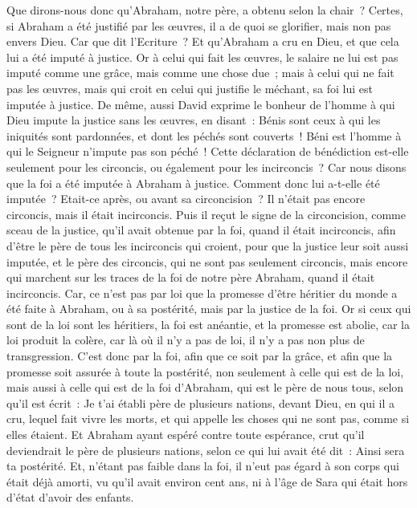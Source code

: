 \begin{multicols}{2}
\VerseOne{}Que dirons-nous donc qu'Abraham, notre père, a obtenu selon la chair~?
Certes, si Abraham a été justifié par les œuvres, il a de quoi se glorifier, mais non pas envers Dieu.
Car que dit l'Ecriture~? Et qu'Abraham a cru en Dieu, et que cela lui a été imputé à justice.
Or à celui qui fait les œuvres, le salaire ne lui est pas imputé comme une grâce, mais comme une chose due~;
mais à celui qui ne fait pas les œuvres, mais qui croit en celui qui justifie le méchant, sa foi lui est imputée à justice.
De même, aussi David exprime le bonheur de l'homme à qui Dieu impute la justice sans les œuvres, en disant~:
Bénis sont ceux à qui les iniquités sont pardonnées, et dont les péchés sont couverts~!
Béni est l'homme à qui le Seigneur n'impute pas son péché~!
Cette déclaration de bénédiction est-elle seulement pour les circoncis, ou également pour les incirconcis~? Car nous disons que la foi a été imputée à Abraham à justice.
Comment donc lui a-t-elle été imputée~? Etait-ce après, ou avant sa circoncision~? Il n'était pas encore circoncis, mais il était incirconcis.
Puis il reçut le signe de la circoncision, comme sceau de la justice, qu'il avait obtenue par la foi, quand il était incirconcis, afin d'être le père de tous les incirconcis qui croient, pour que la justice leur soit aussi imputée,
et le père des circoncis, qui ne sont pas seulement circoncis, mais encore qui marchent sur les traces de la foi de notre père Abraham, quand il était incirconcis.
Car, ce n'est pas par loi que la promesse d'être héritier du monde a été faite à Abraham, ou à sa postérité, mais par la justice de la foi.
Or si ceux qui sont de la loi sont les héritiers, la foi est anéantie, et la promesse est abolie,
car la loi produit la colère, car là où il n'y a pas de loi, il n'y a pas non plus de transgression.
C'est donc par la foi, afin que ce soit par la grâce, et afin que la promesse soit assurée à toute la postérité, non seulement à celle qui est de la loi, mais aussi à celle qui est de la foi d'Abraham, qui est le père de nous tous,
selon qu'il est écrit~: Je t'ai établi père de plusieurs nations, devant Dieu, en qui il a cru, lequel fait vivre les morts, et qui appelle les choses qui ne sont pas, comme si elles étaient.
Et Abraham ayant espéré contre toute espérance, crut qu'il deviendrait le père de plusieurs nations, selon ce qui lui avait été dit~: Ainsi sera ta postérité.
Et, n'étant pas faible dans la foi, il n'eut pas égard à son corps qui était déjà amorti, vu qu'il avait environ cent ans, ni à l'âge de Sara qui était hors d'état d'avoir des enfants.

\end{multicols}

